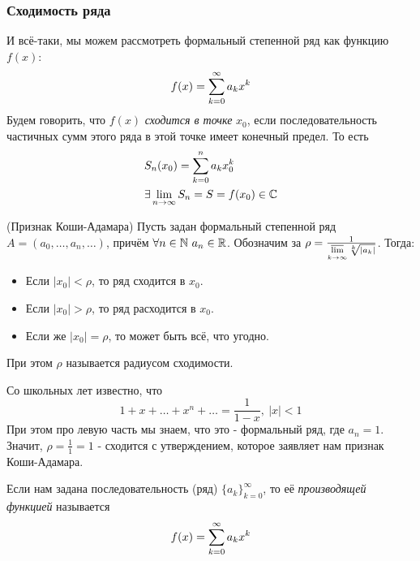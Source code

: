 
\subsubsection*{Сходимость ряда}

\begin{definition}
	И всё-таки, мы можем рассмотреть формальный степенной ряд как функцию $f(x)$:
	\[
		f(x) = \sum\limits_{k = 0}^\infty a_k x^k
	\]
	Будем говорить, что $f(x)$ \textit{сходится в точке} $x_0$, если последовательность частичных сумм этого ряда в этой точке имеет конечный предел. То есть
	\begin{align*}
		&{S_n(x_0) = \sum\limits_{k = 0}^n a_k x_0^k}
		\\
		&{\exists \lim\limits_{n \to \infty} S_n = S = f(x_0) \in \mathbb{C}}
	\end{align*}
\end{definition}

\begin{theorem} (Признак Коши-Адамара)
	Пусть задан формальный степенной ряд $A = (a_0, \ldots, a_n, \ldots)$, причём $\forall n \in \mathbb{N}\ a_n \in \mathbb{R}$. Обозначим за $\rho = \frac{1}{\varlimsup\limits_{k \to \infty} \sqrt[k]{|a_k|}}$. Тогда:
	\begin{itemize}
		\item Если $|x_0| < \rho$, то ряд сходится в $x_0$.
		
		\item Если $|x_0| > \rho$, то ряд расходится в $x_0$.
		
		\item Если же $|x_0| = \rho$, то может быть всё, что угодно.
	\end{itemize}
	При этом $\rho$ называется радиусом сходимости.
\end{theorem}

\begin{example}
	Со школьных лет известно, что
	\[
		1 + x + \ldots + x^n + \ldots = \frac{1}{1 - x},\ |x| < 1
	\]
	При этом про левую часть мы знаем, что это - формальный ряд, где $a_n = 1$. Значит, $\rho = \frac{1}{1} = 1$ - сходится с утверждением, которое заявляет нам признак Коши-Адамара.
\end{example}

\begin{definition}
	Если нам задана последовательность (ряд) $\{a_k\}_{k = 0}^\infty$, то её \textit{производящей функцией} называется
	\[
		f(x) = \sum\limits_{k = 0}^\infty a_k x^k
	\]
\end{definition}

